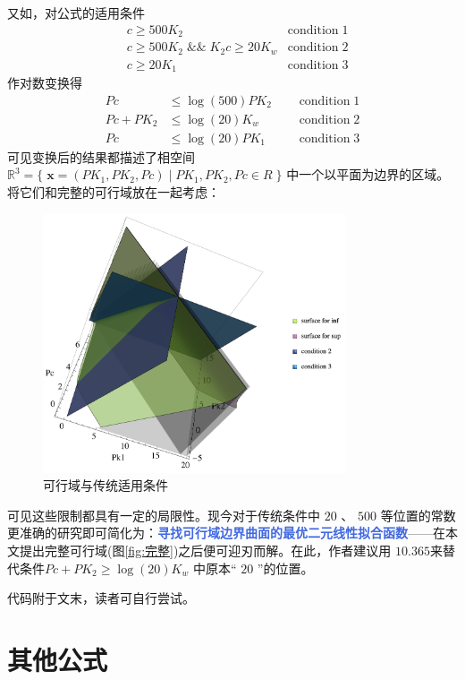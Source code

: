 \documentclass[UTF-8]{ctexart}
\newcommand{\R}{\mathbb{R}}
\newcommand{\0}{\boldsymbol{0}}
\begin{document}
又如，对公式的适用条件
\begin{align*}     
        &c\geq500K_2\;\;\;\;\; &\text{condition} \;1\\   
        &c\geq500K_2 \;\&\&\;K_{2}c\geq20K_w &\text{condition}\;2\\    
        &c\geq20K_1   &\text{condition}\;3
\end{align*}
作对数变换得
\begin{align*}     
Pc&\leq\log (500)PK_2 \;\;\;\;\;&\text{condition} \;1\\ 
Pc+PK_2&\leq\log (20)K_w &\text{condition}\;2\\
Pc&\leq\log (20)PK_1 &\text{condition}\;3
\end{align*}
可见变换后的结果都描述了相空间$ \R^3=\{\;\bm{x}= (PK_1,PK_2,Pc)\;|\;PK_1,PK_2,Pc\in R\;\}$ 中一个以平面为边界的区域。将它们和完整的可行域放在一起考虑：

\begin{figure}[ht]
    \centering
    \includegraphics[width=0.8\textwidth]{封面.png}
    \caption{\kaishu 可行域与传统适用条件}
    \label{fig:可行域与传统适用条件}
\end{figure}

可见这些限制都具有一定的局限性。现今对于传统条件中 $20$ 、 $500$ 等位置的常数更准确的研究即可简化为：\textcolor{RoyalBlue}{\textbf{寻找可行域边界曲面的最优二元线性拟合函数}}——在本文提出完整可行域(图\ref{fig:完整})之后便可迎刃而解。在此，作者建议用 $10.365$来替代条件$ Pc+PK_2\geq\log (20)K_w $ 中原本“ $20$ ”的位置。

代码附于文末，读者可自行尝试。

\section{其他公式}
\end{document}
